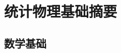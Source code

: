 \chapter{统计物理基础摘要}

\section{数学基础}

\begin{comment}
\subsection{概率与独立性}
现实生活中有很多偶然事件,\,偶然事件的成因是多种多样的,\,它们集中表现在相似的条件下进行试验,\,而能够得到完全不同的结果.\,数学上用抽象的集合来表示所有可能的结果:
\[x\in X,\quad X=\{x\}\]

其中每一个元素代表一种可能的结果.\,这些结果应该有以下特点:
\begin{quote}
{\hei 忠实性}:\,每一个不同的实验结果如实地反应为集合中的不同元素.\,也就是不能用一个元素代替一类实验结果.\\
{\hei 互斥性}:\,当一个结果发生时,\,另一个结果就必须排除,\,也就是不能有多个元素对应同样的实验结果.\\
{\hei 完备性}:\,所有的实验结果必须都有集合中的元素对应.
\end{quote}

这样就能把集合\(X\)称为\emph{样本空间}(sample space),\,而每一个元素\(x\)也称为一个\emph{元事件}(elementary event).\,我们常说的\emph{事件}(event),\,其实一般指样本空间的一些定义良好的子集\(A\subset X\).\,只要实验结果在这个子集中,\,就说这个事件发生了.\,所谓定义良好我们可以做如下理解:

在\emph{古典概型}(classic models)情形下,\,样本空间是一个有限的集合,\,此时任意子集都可以视为某种事件.\,如投一颗骰子,\,样本空间为\(X=\{1,2,3,4,5,6\}\),\,则投出偶数是一个事件\(A=\{2,4,6\}\).

但在\emph{几何概型}(geometric models)情形下,\,样本空间一般具有与\(\mathbb{R}^n\)类似的结构,\,一般都是无限的集合,\,有一些``事件''的提法应当给予摒弃否则会引起矛盾.\,例如在闭区间\([0,1]\)间任取一个点,\,这个点恰好是有理数这样的``事件''可能就不是那么定义良好\footnote{事实上有理数集是定义良好---可测的,\,但有些集合不可测从而不能讨论它们的概率.\,参考\url{https://en.wikipedia.org/wiki/Non-measurable_set}}.\,一般常见的事件如点落在区间\((a,b)\)内等等.

设想同时做好几个实验,\,这几个实验互不干扰\,它们的结果是完全独立的,\,那么联合到一起就构成了一个大的实验,\,其结果应表示为一个数组:
\[\bs{x}=(x_i)\quad ;\quad x_i\in X_i\]


\end{comment}
